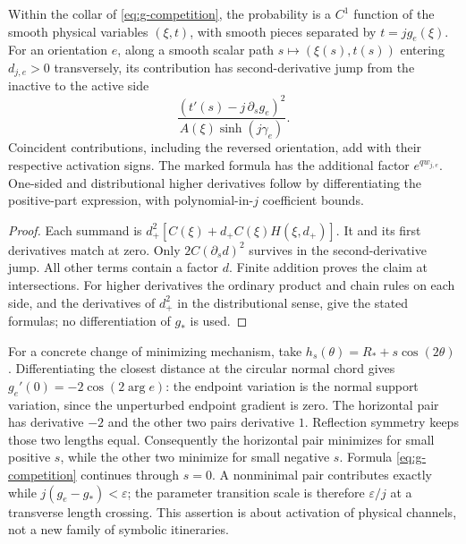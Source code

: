 \begin{corollary}\label{cor:g-interfaces}
Within the collar of \eqref{eq:g-competition}, the probability is a
$C^1$ function of the smooth physical variables $(\xi,t)$, with smooth
pieces separated by $t=jg_e(\xi)$. For an orientation $e$, along a smooth
scalar path $s\mapsto(\xi(s),t(s))$ entering $d_{j,e}>0$ transversely,
its contribution has second-derivative jump from the inactive to the active side
\begin{equation}\label{eq:g-interface-jump}
       \frac{(t'(s)-j\,\partial_s g_e)^2}{A(\xi)\sinh(j\gamma_e)}.
\end{equation}
Coincident contributions, including the reversed orientation, add with
their respective activation signs.
The marked formula has the additional factor $e^{qw_{j,e}}$.
One-sided and distributional higher derivatives follow by differentiating
the positive-part expression, with polynomial-in-$j$ coefficient bounds.
\end{corollary}
\begin{proof}
Each summand is $d_+^2[C(\xi)+d_+C(\xi)H(\xi,d_+)]$.
It and its first derivatives match at zero. Only
$2C(\partial_s d)^2$ survives in the second-derivative jump.
All other terms contain a factor $d$. Finite addition proves the
claim at intersections. For higher derivatives the ordinary product
and chain rules on each side, and the derivatives of $d_+^2$ in the
distributional sense, give the stated formulas; no differentiation of
$g_*$ is used.
\end{proof}

For a concrete change of minimizing mechanism, take
$h_s(\theta)=R_*+s\cos(2\theta)$. Differentiating the closest distance
at the circular normal chord gives
$g_e'(0)=-2\cos(2\arg e)$: the endpoint variation is the normal support
variation, since the unperturbed endpoint gradient is zero.
The horizontal pair has derivative $-2$ and the other two pairs derivative
$1$. Reflection symmetry keeps those two lengths equal. Consequently
the horizontal pair minimizes for small positive $s$, while the other
two minimize for small negative $s$. Formula \eqref{eq:g-competition}
continues through $s=0$. A nonminimal pair contributes exactly while
$j(g_e-g_*)<\varepsilon$; the parameter transition scale is therefore
$\varepsilon/j$ at a transverse length crossing. This assertion is about
activation of physical channels, not a new family of symbolic itineraries.

